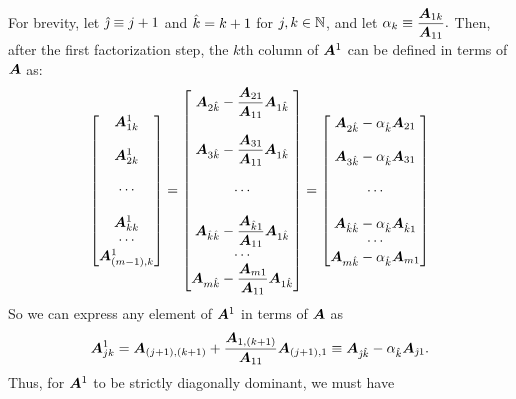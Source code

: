 \documentclass[twoside,10pt]{article}
\begin{document}
\begin{enumerate}
  For brevity, let $\hat{\jmath} \equiv j + 1$ and $\hat{k} = k + 1$ for $j, k \in \mathbb{N}$, and let $\alpha_k \equiv \dfrac{\bm{A}_{1k}}{\bm{A}_{1 1}}.$
  Then, after the first factorization step, the $k$th column of $\bm{A}^1$ can be defined in terms of $\bm{A}$ as:
  \[
    \begin{bmatrix*}
      \mtx{A}^1_{1 k}\\
      \\
      \mtx{A}^1_{2 k}\\
      \\
      \cdots\\
      \\
      \mtx{A}^1_{k k}\\
      \cdots\\
      \mtx{A}^1_{(m-1), k}
    \end{bmatrix*}
    =
    \begin{bmatrix*}
      \mtx{A}_{2\Y} - \dfrac{\mtx{A}_{2 1}}{\mtx{A}_{1 1}}\mtx{A}_{1\Y}\\
      \\
      \mtx{A}_{3\Y} - \dfrac{\mtx{A}_{3 1}}{\mtx{A}_{1 1}}\mtx{A}_{1\Y}\\
      \\
      \cdots\\
      \\
      \mtx{A}_{\Y\Y} - \dfrac{\mtx{A}_{\Y 1}}{\mtx{A}_{1 1}}\mtx{A}_{1\Y}\\
      \cdots\\
      \mtx{A}_{m\Y} - \dfrac{\mtx{A}_{m 1}}{\mtx{A}_{1 1}}\mtx{A}_{1\Y}
    \end{bmatrix*}
    =
    \begin{bmatrix*}
      \mtx{A}_{2\Y} - \alpha_{\Y}\mtx{A}_{2 1}\\
      \\
      \mtx{A}_{3\Y} - \alpha_{\Y}\mtx{A}_{3 1}\\
      \\
      \cdots\\
      \\
      \mtx{A}_{\Y\Y} - \alpha_{\Y}\mtx{A}_{\Y1}\\
      \cdots\\
      \mtx{A}_{m\Y} - \alpha_{\Y}\mtx{A}_{m1}
    \end{bmatrix*}
  \]
  So we can express any element of $\bm{A}^1$ in terms of $\bm{A}$ as
  $$\bm{A}^1_{jk} = \bm{A}_{(j+1),(k+1)} + \dfrac{\bm{A}_{1,(k+1)}}{\bm{A}_{1 1}}\bm{A}_{(j+1),1} \equiv \bm{A}_{\hat{\jmath}\hat{k}} - \alpha_{\hat{k}} \bm{A}_{\hat{\jmath} 1}.$$
  Thus, for $\bm{A}^1$ to be strictly diagonally dominant, we must have

\end{enumerate}
\end{document}
